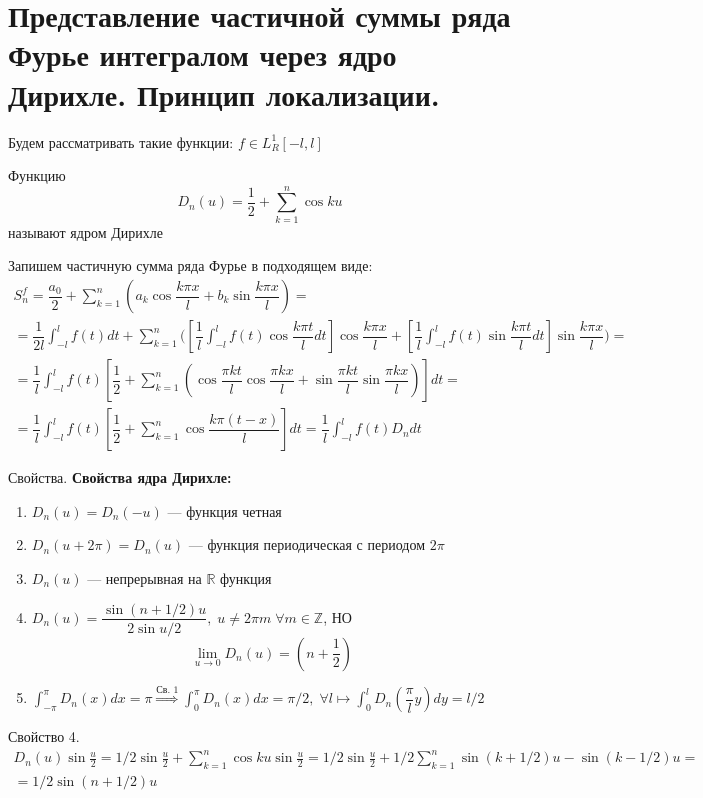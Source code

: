 \section{Представление частичной суммы ряда Фурье интегралом через ядро Дирихле. Принцип локализации.}
Будем рассматривать такие функции: $ f \in L_R^1[-l,l] $
\begin{greyDefinition}Функцию
	\[
	D_n(u) = \dfrac{1}{2} + \sum_{k=1}^n \cos ku
	\]
	называют ядром Дирихле
\end{greyDefinition}
Запишем частичную сумма ряда Фурье в подходящем виде:
\begin{multline*}
	S_n^f = \dfrac{a_0}{2} + \sum_{k=1}^n \left(a_k \cos \dfrac{k\pi x}{l} + b_k \sin \dfrac{k\pi x}{l}\right)= \\ = \dfrac{1}{2l} \int_{-l}^l f(t)dt +  \sum_{k=1}^n \Bigg( \left[ \dfrac{1}{l} \int_{-l}^l f(t)\cos \dfrac{k\pi t}{l} dt \right] \cos \dfrac{k\pi x}{l} + \left[ \dfrac{1}{l} \int_{-l}^l f(t) \sin \dfrac{k\pi t}{l}dt \right] \sin \dfrac{k\pi x}{l} \Bigg) =\\= \dfrac{1}{l} \int_{-l}^l f(t) \left[ \dfrac{1}{2} + \sum_{k=1}^n \left( \cos \dfrac{\pi k t}{l} \cos \dfrac{\pi k x}{l} + \sin \dfrac{\pi k t}{l} \sin \dfrac{\pi k x}{l} \right) \right]dt = \\ =\dfrac{1}{l} \int_{-l}^l f(t) \left[ \dfrac{1}{2} + \sum_{k=1}^n \cos \dfrac{k\pi (t-x)}{l} \right]dt = \dfrac{1}{l} \int_{-l}^{l} f(t) D_n dt
\end{multline*}
\begin{greySmth}{Свойства.}
\textbf{Свойства ядра Дирихле:}
\begin{enumerate}
	\item $ D_n (u) = D_n(-u) $ --- функция четная
	\item $ D_n(u+2\pi) = D_n(u) $ --- функция периодическая с периодом $ 2\pi $
	\item $ D_n(u)  $ --- непрерывная на $ \mathbb{R} $ функция
	\item $ D_n(u) = \dfrac{\sin (n+1/2)u}{2\sin u/2},\; u \neq 2\pi m\; \forall m \in \mathbb{Z} $, НО \[
	\lim\limits_{u \rightarrow 0} D_n(u) = (n+\frac{1}{2})
	\]
	\item $ \int_{-\pi}^{\pi} D_n(x)dx = \pi \overset{\text{Св. 1}}{\Longrightarrow} \int_{0}^{\pi} D_n(x) dx= \pi/2,\; \forall l \mapsto \int_{0}^{l} D_n\left(\dfrac{\pi}{l}y\right)dy = l/2 $
\end{enumerate}
\end{greySmth}
\begin{greyProof} Свойство 4.
	\begin{multline*}
		D_n(u) \sin \frac{u}{2} = 1/2 \sin \frac{u}{2} + \sum_{k=1}^n \cos ku \sin \frac{u}{2} = 1/2 \sin \frac{u}{2} + 1/2\sum_{k=1}^n \sin (k+1/2)u - \sin (k-1/2)u =\\= 1/2 \sin (n+1/2)u
	\end{multline*}%
\end{greyProof}

